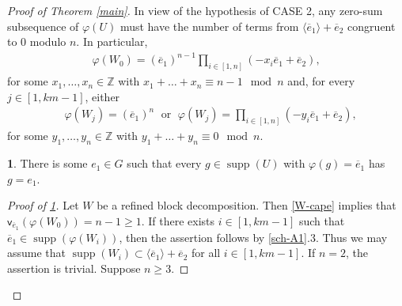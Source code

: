 \documentclass[11pt]{amsart}
\theoremstyle{definition}
\newtheorem{claim}{}[theorem]
\newcommand{\Z}{\mathbb Z}
\DeclareMathOperator{\supp}{supp}
\newcommand{\la}{\langle}
\newcommand{\ra}{\rangle}
\newcommand{\vp}{\mathsf v}
\numberwithin{equation}{section}
\begin{document}
\begin{proof}[Proof of Theorem \ref{main}]
 In view of the hypothesis of CASE 2, any zero-sum subsequence of $\varphi(U)$ must have the number of  terms from $\la \overline e_1\ra+\overline e_2$  congruent to $0$ modulo $n$. In particular,
	\begin{align}\label{W-cape}\varphi(W_0)=(\overline e_1)^{n-1}
		\prod_{i\in [1,n]}(-x_i\overline e_1+\overline e_2),\end{align} for some  $x_1,\ldots,x_n\in  \Z$  with $x_1+\ldots+x_n\equiv n-1\mod n$
	and, for every $j\in[1,km-1]$, either \begin{align}\label{steer}
		&\varphi(W_j)=(\overline e_1)^n\;\mbox{ or }\; \varphi(W_j)=\prod_{i\in [1,n]}(-y_{i}\overline e_1+\overline e_2),\end{align} for some $y_{1},\ldots,y_{n}\in \Z$ with   $y_{1}+\ldots+y_{n}\equiv 0\mod n$.
	

	
	\begin{claim}
		\label{sch-A2} There is some $e_1\in G$ such that every $g\in \supp(U)$ with $\varphi(g)=\overline e_1$ has $g=e_1$.
	\end{claim}
	
	\begin{proof}[Proof of \ref{sch-A2}]
	Let $W$ be a refined block decomposition.
	Then \eqref{W-cape} implies that $\vp_{\overline e_1}(\varphi(W_0))=n-1\geq 1$. If there exists $i\in [1, km-1]$ such that $\overline e_1\in \supp(\varphi(W_i))$, then the assertion follows by \ref{sch-A1}.3.
	Thus we may assume that $\supp(W_i)\subset \la \overline e_1\ra+\overline e_2$ for all $i\in [1,km-1]$.
	If $n=2$, the assertion is trivial. Suppose $n\ge 3$.  
		

\end{proof}
\end{proof}
\end{document}
